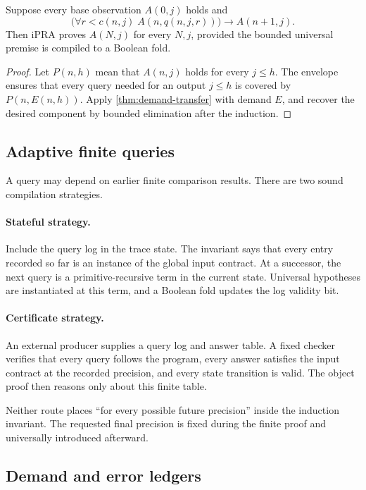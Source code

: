 \begin{theorem}
\label{thm:finite-query-induction}
Suppose every base observation \(A(0,j)\) holds and
\[
 \bigl(\forall r<c(n,j)\;A(n,q(n,j,r))\bigr)\to A(n+1,j).
\]
Then iPRA proves \(A(N,j)\) for every \(N,j\), provided the bounded universal
premise is compiled to a Boolean fold.
\end{theorem}

\begin{proof}
Let \(P(n,h)\) mean that \(A(n,j)\) holds for every \(j\le h\).  The envelope
ensures that every query needed for an output \(j\le h\) is covered by
\(P(n,E(n,h))\).  Apply \cref{thm:demand-transfer} with demand \(E\), and
recover the desired component by bounded elimination after the induction.
\end{proof}

\subsection{Adaptive finite queries}

A query may depend on earlier finite comparison results.  There are two sound
compilation strategies.

\paragraph{Stateful strategy.}
Include the query log in the trace state.  The invariant says that every entry
recorded so far is an instance of the global input contract.  At a successor,
the next query is a primitive-recursive term in the current state.  Universal
hypotheses are instantiated at this term, and a Boolean fold updates the log
validity bit.

\paragraph{Certificate strategy.}
An external producer supplies a query log and answer table.  A fixed checker
verifies that every query follows the program, every answer satisfies the
input contract at the recorded precision, and every state transition is valid.
The object proof then reasons only about this finite table.

Neither route places ``for every possible future precision'' inside the
induction invariant.  The requested final precision is fixed during the finite
proof and universally introduced afterward.

\subsection{Demand and error ledgers}


